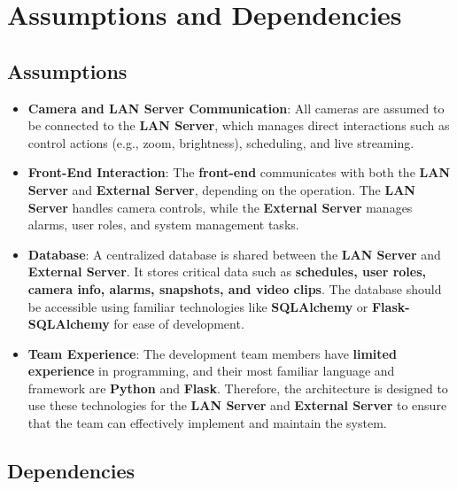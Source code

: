 \documentclass{article}
\begin{document}
\section{Assumptions and Dependencies}

\subsection{Assumptions}

\begin{itemize}
    \item \textbf{Camera and LAN Server Communication}: All cameras are assumed to be connected to the \textbf{LAN Server}, which manages direct interactions such as control actions (e.g., zoom, brightness), scheduling, and live streaming.
    \item \textbf{Front-End Interaction}: The \textbf{front-end} communicates with both the \textbf{LAN Server} and \textbf{External Server}, depending on the operation. The \textbf{LAN Server} handles camera controls, while the \textbf{External Server} manages alarms, user roles, and system management tasks.
    \item \textbf{Database}: A centralized database is shared between the \textbf{LAN Server} and \textbf{External Server}. It stores critical data such as \textbf{schedules, user roles, camera info, alarms, snapshots, and video clips}. The database should be accessible using familiar technologies like \textbf{SQLAlchemy} or \textbf{Flask-SQLAlchemy} for ease of development.
    \item \textbf{Team Experience}: The development team members have \textbf{limited experience} in programming, and their most familiar language and framework are \textbf{Python} and \textbf{Flask}. Therefore, the architecture is designed to use these technologies for the \textbf{LAN Server} and \textbf{External Server} to ensure that the team can effectively implement and maintain the system.
\end{itemize}

\subsection{Dependencies}
\end{document}
